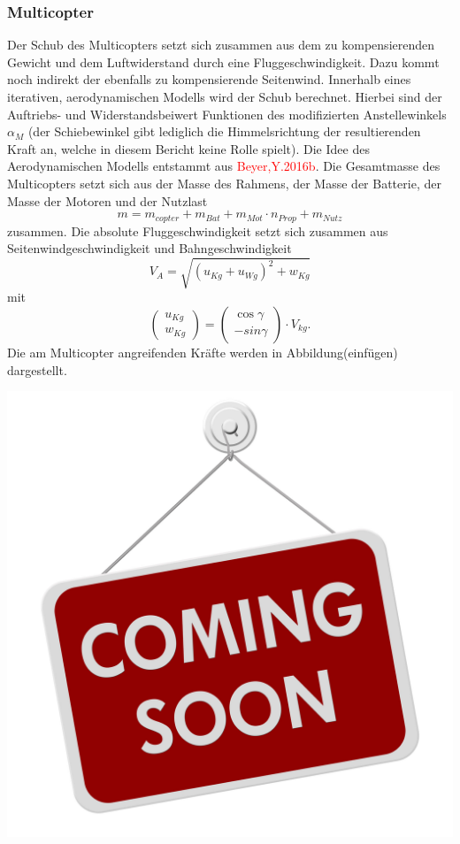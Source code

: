 \subsubsection{Multicopter}
Der Schub des Multicopters setzt sich zusammen aus dem zu kompensierenden Gewicht und dem Luftwiderstand durch eine Fluggeschwindigkeit. Dazu kommt noch indirekt der ebenfalls zu kompensierende Seitenwind. Innerhalb eines iterativen, aerodynamischen Modells wird der Schub berechnet. Hierbei sind der Auftriebs- und Widerstandsbeiwert Funktionen des modifizierten Anstellewinkels \ensuremath{\alpha_M} (der Schiebewinkel gibt lediglich die Himmelsrichtung der resultierenden Kraft an, welche in diesem Bericht keine Rolle spielt). Die Idee des Aerodynamischen Modells entstammt aus \textcolor{red}{Beyer,Y.2016b}. 
Die Gesamtmasse des Multicopters setzt sich aus der Masse des Rahmens, der Masse der Batterie, der Masse der Motoren und der Nutzlast
\begin{equation}
	m = m_{copter}+m_{Bat}+m_{Mot}\cdot n_{Prop}+m_{Nutz}
\end{equation}
zusammen.
Die absolute Fluggeschwindigkeit setzt sich zusammen aus Seitenwindgeschwindigkeit und Bahngeschwindigkeit
\begin{equation}
	V_A = \sqrt{(u_{Kg} + u_{Wg})^2+w_{Kg}}
\end{equation}
mit
\begin{equation}
	\begin{pmatrix} u_{Kg} \\ w_{Kg} \end{pmatrix} = \begin{pmatrix}
	\cos\gamma \\ -sin{\gamma}	\end{pmatrix} \cdot V_{kg}.
\end{equation}
Die am Multicopter angreifenden Kräfte werden in Abbildung(einfügen) dargestellt. 
\begin{center}
\includegraphics[scale=0.2]{images/Coming-Soon.jpg}
\end{center}
